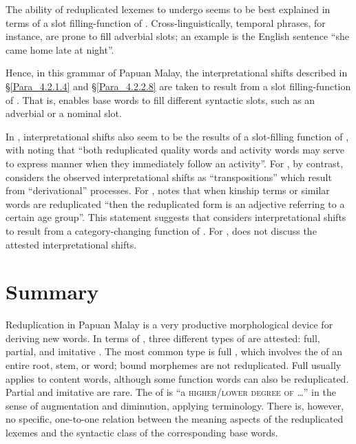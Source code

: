 {The ability of reduplicated lexemes to undergo  seems to be best explained in terms of a slot filling-function of . Cross-linguistically, temporal  phrases, for instance, are prone to fill adverbial slots; an example is the English sentence ``she came home late at night''.



Hence, in this grammar of Papuan Malay, the interpretational shifts described in §\ref{Para_4.2.1.4} and §\ref{Para_4.2.2.8} are taken to result from a slot filling-function of . That is,  enables base words to fill different syntactic slots, such as an adverbial or a nominal slot.

 
In , interpretational shifts also seem to be the results of a slot-filling function of , with {\citet[220]{Litamahuputty.2012} }noting that “both reduplicated quality words and activity words may serve to express manner when they immediately follow an activity”. For , by contrast, \citet[118, 123, 125]{vanMinde.1997} considers the observed interpretational shifts as “transpositions” which result from “derivational” processes. For , {\citet[26]{Stoel.2005}} notes that when kinship terms or similar words are reduplicated “then the reduplicated form is an adjective referring to a certain age group”. This statement suggests that {\citet{Stoel.2005}} considers interpretational shifts to result from a category-changing function of . For , \citet[126, 270]{Paauw.2009} does not discuss the attested interpretational shifts.


\section{Summary}
\label{Para_4.4}
Reduplication in Papuan Malay is a very productive morphological device for deriving new words. In terms of , three different types of  are attested: full, partial, and imitative . The most common type is full , which involves the  of an entire root, stem, or word; bound morphemes are not reduplicated. Full  usually applies to content words, although some function words can also be reduplicated. Partial and imitative  are rare. The  of  is ``a \textsc{higher}/\textsc{lower} \textsc{degree} \textsc{of} \ldots'' in the sense of augmentation and diminution, applying  terminology. There is, however, no specific, one-to-one relation between the meaning aspects of the reduplicated lexemes and the syntactic class of the corresponding base words.


}
